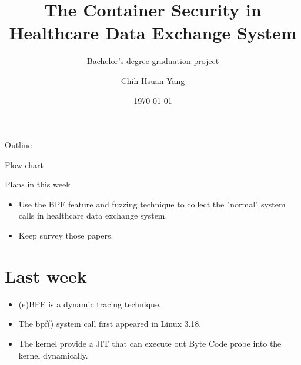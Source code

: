 \documentclass{beamer}
\title{The Container Security in Healthcare Data Exchange System}
\subtitle{Bachelor's degree graduation project}
\author{Chih-Hsuan Yang}
\institute{National Sun Yat-sen University\\
Advisor: Chun-I Fan
}
\date{\today}
\begin{document}
\begin{CJK*}{UTF8}{bsmi}

  \begin{frame}
    \titlepage
  \end{frame}


  \begin{frame}{Outline}
    \begin{multicols}{2}
      \tableofcontents
    \end{multicols}
  \end{frame}

  \begin{frame}{Flow chart}
    \centering
    \scalebox{0.9} {
    }
  \end{frame}


  \begin{frame}{Plans in this week}
    \begin{itemize}
      \item Use the BPF feature and fuzzing technique to collect the "normal" system calls in healthcare data exchange system.
      \item Keep survey those papers.
    \end{itemize}
  \end{frame}

  \section{Last week}
  \begin{frame}
    \begin{itemize}
      \item (e)BPF is a dynamic tracing technique.
      \item The bpf() system call first appeared in Linux 3.18.
      \item The kernel provide a JIT that can execute out Byte Code probe into the kernel dynamically.
    \end{itemize}
  \end{frame}


\end{CJK*}
\end{document}
